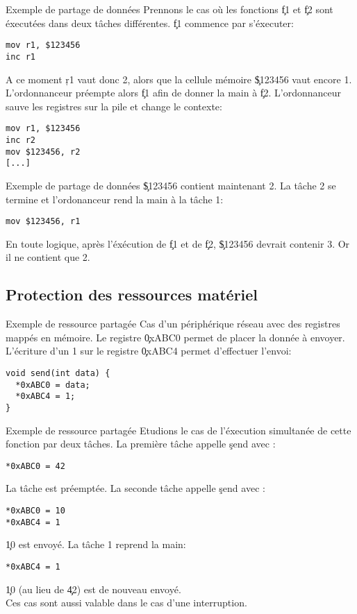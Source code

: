 \begin{frame}[fragile]{Exemple de partage de données}
  Prennons le  cas où  les fonctions \c{f1}  et \c{f2}  sont éxecutées
  dans deux tâches différentes.  \c{f1} commence par s'éxecuter:
\begin{lstlisting} 
mov r1, $123456
inc r1
  \end{lstlisting} 
  A  ce  moment \c{r1}  vaut  donc 2,  alors  que  la cellule  mémoire
  \c{\$123456}  vaut encore 1.   L'ordonnanceur préempte  alors \c{f1}
  afin de donner la main à \c{f2}.  L'ordonnanceur sauve les registres
  sur la pile et change le contexte:
\begin{lstlisting} 
mov r1, $123456
inc r2
mov $123456, r2
[...]
  \end{lstlisting} 
\end{frame}

\begin{frame}[fragile]{Exemple de partage de données}
  \c{\$123456}  contient  maintenant 2.   La  tâche  2  se termine  et
  l'ordonanceur rend la main à la tâche 1:
  \begin{lstlisting} 
mov $123456, r1
  \end{lstlisting} 
  En  toute  logique,  après  l'éxécution  de  \c{f1}  et  de  \c{f2},
  \c{\$123456} devrait contenir 3. Or il ne contient que 2.
\end{frame} 

\subsection{Protection des ressources matériel}

\begin{frame}[fragile]{Exemple de ressource partagée}
  Cas d'un  périphérique réseau avec des registres  mappés en mémoire.
  Le  registre  \c{0xABC0}  permet  de  placer la  donnée  à  envoyer.
  L'écriture  d'un 1  sur  le registre  \c{0xABC4} permet  d'effectuer
  l'envoi:
\begin{lstlisting} 
void send(int data) {
  *0xABC0 = data;
  *0xABC4 = 1;
}
  \end{lstlisting} 
\end{frame} 

\begin{frame}[fragile]{Exemple de ressource partagée}
  Etudions le cas de l'éxecution simultanée de cette fonction par deux
  tâches.  La première tâche appelle \c{send} avec :
  \begin{lstlisting} 
*0xABC0 = 42
  \end{lstlisting} 
  La  tâche est  préemptée.  La  seconde tâche  appelle  \c{send} avec
  :
\begin{lstlisting} 
*0xABC0 = 10
*0xABC4 = 1
\end{lstlisting} 
  \c{10} est envoyé. La tâche 1 reprend la main:
\begin{lstlisting} 
*0xABC4 = 1
\end{lstlisting} 
  \c{10} (au lieu de \c{42}) est de nouveau envoyé.\\[3mm]

  Ces cas sont aussi valable dans le cas d'une interruption.
\end{frame} 

